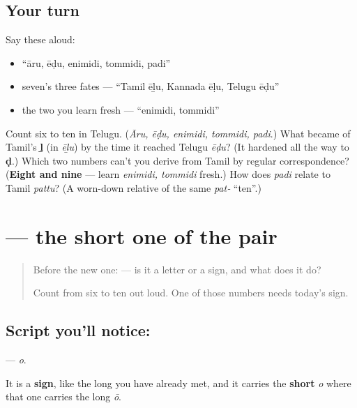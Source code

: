 \subsection*{Your turn}
Say these aloud:

\begin{itemize}
\raggedright
  \item \textquotedblleft{}āru, ēḍu, enimidi, tommidi, padi\textquotedblright{}
  \item seven's three fates — \textquotedblleft{}Tamil ēḻu, Kannada ēḷu, Telugu ēḍu\textquotedblright{}
  \item the two you learn fresh — \textquotedblleft{}enimidi, tommidi\textquotedblright{}
\end{itemize}

\begin{tcolorbox}[breakable,colback=teal!4,colframe=teal!35!black,title={Before you move on}]
Count six to ten in Telugu. (\emph{Āru, ēḍu, enimidi, tommidi, padi}.) What became of Tamil's \textbf{ḻ} (in \emph{ēḻu}) by the time it reached Telugu \emph{ēḍu}? (It hardened all the way to \textbf{ḍ}.) Which two numbers can't you derive from Tamil by regular correspondence? (\textbf{Eight and nine} — learn \emph{enimidi, tommidi} fresh.) How does \emph{padi} relate to Tamil \emph{pattu}? (A worn-down relative of the same \emph{pat‑} \textquotedblleft{}ten\textquotedblright{}.)
\end{tcolorbox}
\section[\texorpdfstring{\te{ొ} (o)}{ొ (o)}]{ — the short one of the pair}

\label{lesson:TE-S154-vowel-sign-o}



\begin{quote}
Before the new one:  — is it a letter or a sign, and what does it do?

Count from six to ten out loud. One of those numbers needs today's sign.
\end{quote}

\subsection*{Script you'll notice: }
\textbf{} — \emph{o}.

It is a \textbf{sign}, like the long \textbf{} you have already met, and it carries the \textbf{short} \emph{o} where that one carries the long \emph{ō}.

